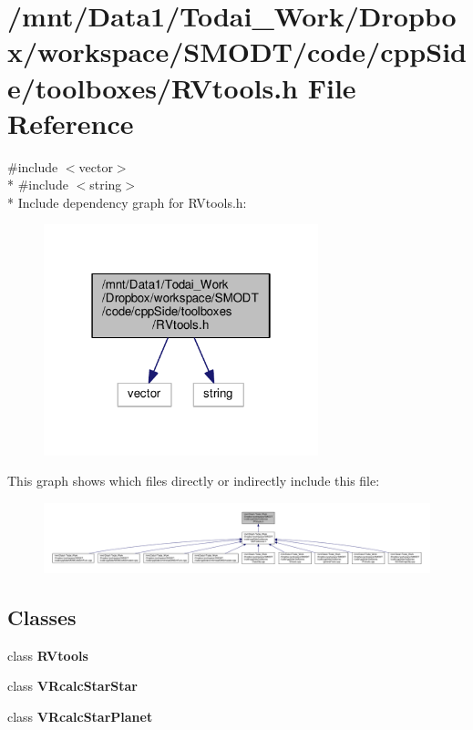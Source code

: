 \section{/mnt/\-Data1/\-Todai\-\_\-\-Work/\-Dropbox/workspace/\-S\-M\-O\-D\-T/code/cpp\-Side/toolboxes/\-R\-Vtools.h File Reference}
\label{_r_vtools_8h}
{\ttfamily \#include $<$vector$>$}\\*
{\ttfamily \#include $<$string$>$}\\*
Include dependency graph for R\-Vtools.\-h\-:\nopagebreak
\begin{figure}[H]
\begin{center}
\leavevmode
\includegraphics[width=226pt]{_r_vtools_8h__incl}
\end{center}
\end{figure}
This graph shows which files directly or indirectly include this file\-:\nopagebreak
\begin{figure}[H]
\begin{center}
\leavevmode
\includegraphics[width=350pt]{_r_vtools_8h__dep__incl}
\end{center}
\end{figure}
\subsection*{Classes}
\begin{DoxyCompactItemize}
\item 
class {\bf R\-Vtools}
\item 
class {\bf V\-Rcalc\-Star\-Star}
\item 
class {\bf V\-Rcalc\-Star\-Planet}
\end{DoxyCompactItemize}
